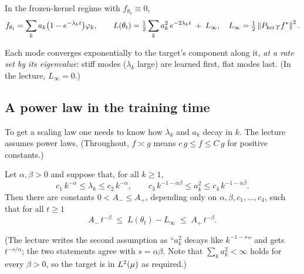 \begin{prop}\label{prop:solution}
In the frozen-kernel regime with $f_{\theta_0}\equiv0$,
\[
  f_{\theta_t}=\sum_{k}a_k\big(1-e^{-\lambda_kt}\big)\varphi_k,\qquad
  L(\theta_t)=\tfrac12\sum_{k}a_k^2\,e^{-2\lambda_kt}\;+\;L_\infty,\quad L_\infty=\tfrac12\left\lVert P_{\ker T}f^*\right\rVert^2 .
\]
\end{prop}
\noindent Each mode converges exponentially to the target's component along it, \emph{at a rate set by its eigenvalue}: stiff modes ($\lambda_k$ large) are learned first, flat modes last. (In the lecture, $L_\infty=0$.)

\subsection{A power law in the training time}\label{sec:L2-power}
To get a scaling law one needs to know how $\lambda_k$ and $a_k$ decay in $k$. The lecture assumes power laws. (Throughout, $f\asymp g$ means $c\,g\le f\le C\,g$ for positive constants.)

\begin{prop}\label{prop:powerlaw}
Let $\alpha,\beta>0$ and suppose that, for all $k\ge1$,
\[
  c_1\,k^{-\alpha}\le\lambda_k\le c_2\,k^{-\alpha},\qquad c_3\,k^{-1-\alpha\beta}\le a_k^2\le c_4\,k^{-1-\alpha\beta}.
\]
Then there are constants $0<A_-\le A_+$, depending only on $\alpha,\beta,c_1,\dots,c_4$, such that for all $t\ge1$
\[
   A_-\,t^{-\beta}\;\le\;L(\theta_t)-L_\infty\;\le\;A_+\,t^{-\beta}.
\]
\end{prop}
(The lecture writes the second assumption as ``$a_k^2$ decays like $k^{-1-s}$'' and gets $t^{-s/\alpha}$; the two statements agree with $s=\alpha\beta$. Note that $\sum_ka_k^2<\infty$ holds for every $\beta>0$, so the target is in $L^2(\mu)$ as required.)

